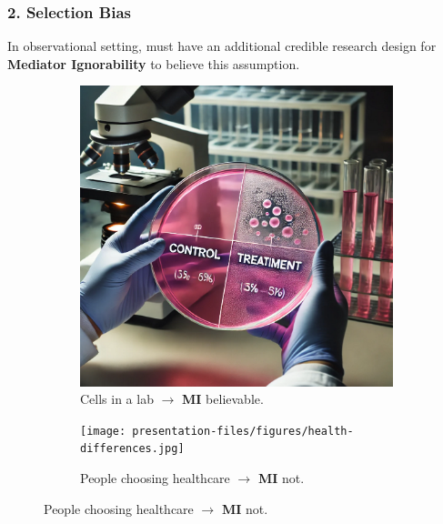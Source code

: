 \documentclass[dvipsnames]{beamer} %
\begin{document}
\begin{frame}
    \frametitle{2. Selection Bias}
    In observational setting, 
    must have an additional credible research design for \textbf{Mediator Ignorability} to believe this assumption.
    \vskip-0.5cm
    \begin{figure}[h!]
        \centering
        \singlespacing
        \begin{subfigure}[c]{0.475\textwidth}
            \centering
            \caption{Cells in a lab
                $\to$ \textbf{MI} believable.}
            \includegraphics[width=\textwidth]{presentation-files/figures/science-lab.png}
        \end{subfigure}
        \begin{subfigure}[c]{0.475\textwidth}
            \centering
            \caption{People choosing healthcare
                $\to$ \textbf{MI} not.}
            \texttt{[image: presentation-files/figures/health-differences.jpg]}
        \end{subfigure}
    \end{figure}
\end{frame}
\end{document}

